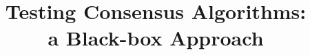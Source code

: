 \documentclass[11pt,a4paper,twoside,openright]{book}
\begin{document}
\title{Testing Consensus Algorithms:\\a Black-box Approach}
\providecommand{\autore}{Bortoli Gianluca, Federici Marco, Taneburgo Gianvito}
\providecommand{\principaladviser}{Alberto Montresor}
\providecommand{\annoacc}{2015-2016}

\titlep

\frontmatter
{}

\tableofcontents

\clearpage
\pagestyle{headings}
\renewcommand{\chaptermark}[1]{\markboth{{\chaptername}\ \thechapter.\hspace{1em}#1}{}}

\mainmatter







\renewcommand{\chaptermark}[1]{\markboth{{\appendixname}\ \thechapter.\hspace{1em}#1}{}}

%

%
%
\end{document}
